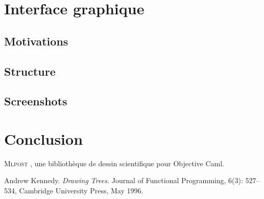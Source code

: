 \documentclass[a4paper,12pt]{article}
\newcommand{\mlpost}{\textsc{Mlpost }}
\begin{document}
\cite{tree}

\section{Interface graphique}
\subsection{Motivations}
\subsection{Structure}
\subsection{Screenshots}
\section{Conclusion}

\begin{thebibliography}{99}
 \mlpost, une bibliothèque de dessin 
 scientifique pour Objective Caml.

Andrew Kennedy. 
\emph{Drawing Trees.}
Journal of Functional Programming, 
6(3): 527--534, Cambridge University Press, May 1996.
\end{thebibliography}
\end{document}
